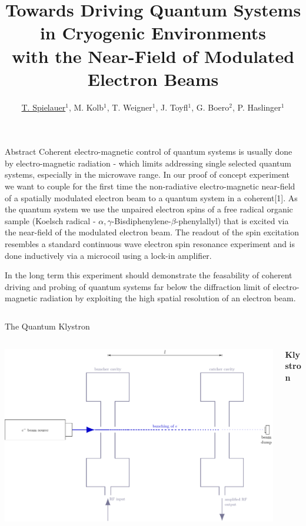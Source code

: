 \documentclass[final]{beamer}
\title{Towards Driving Quantum Systems in Cryogenic Environments\hspace*{1cm} \\ with the Near-Field of Modulated Electron Beams}
\author{\underline{T. Spielauer$^{1}$}, M. Kolb$^{1}$, T. Weigner$^{1}$, J. Toyfl$^{1}$, G. Boero$^{2}$, P. Haslinger$^{1}$ }
\institute[]{
  {\small
  $^{1}$VCQ, Technische Universität Wien, Atominstitut, Stadionallee 2, 1020 Vienna, Austria; $^{2}$EPFL, BM 3110 Station 17, CH-1015 Lausanne, Switzerland
  }
}
\begin{document}
\begin{frame}[fragile]{}
  \begin{block}{\Large Abstract}
    Coherent electro-magnetic control of quantum systems is usually done by
    electro-magnetic radiation - which limits addressing single selected
    quantum systems, especially in the microwave range. In our proof of concept
    experiment we want to couple for the first time the non-radiative electro-magnetic
    near-field of a spatially modulated electron beam to a quantum system in
    a coherent[1].  As the quantum system we
    use the unpaired electron spins of a free radical organic sample (Koelsch radical
    - $\alpha,\gamma$-Bisdiphenylene-$\beta$-phenylallyl) that is excited via the
    near-field of the modulated electron beam. The readout of the spin excitation
    resembles a standard continuous wave electron spin resonance experiment and is
    done inductively via a microcoil using a lock-in amplifier.

    In the long term this experiment should demonstrate the feasability of
    coherent driving and probing of quantum systems far below the diffraction
    limit of electro-magnetic radiation by exploiting the high spatial resolution of an
    electron beam.
  \end{block}
  \begin{columns}[T]
    \begin{column}{.49\linewidth}
      \begin{block}{\Large The Quantum Klystron}

        \begin{columns}
          \begin{column}{0.45\columnwidth}
              \includegraphics[width=\columnwidth]{figures/klystron.pdf}
          \end{column}
          \begin{column}{0.55\columnwidth}\begin{center}
              {\large \textbf{Klystron}}
            \end{center}


\end{column}
\end{columns}
\end{block}
\end{column}
\end{columns}
\end{frame}
\end{document}
